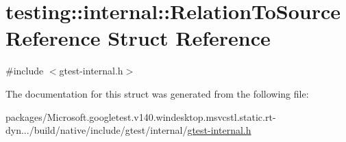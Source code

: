 \hypertarget{structtesting_1_1internal_1_1_relation_to_source_reference}{}\section{testing\+::internal\+::Relation\+To\+Source\+Reference Struct Reference}
\label{structtesting_1_1internal_1_1_relation_to_source_reference}


{\ttfamily \#include $<$gtest-\/internal.\+h$>$}



The documentation for this struct was generated from the following file\+:\begin{DoxyCompactItemize}
\item 
packages/\+Microsoft.\+googletest.\+v140.\+windesktop.\+msvcstl.\+static.\+rt-\/dyn.../build/native/include/gtest/internal/\mbox{\hyperlink{gtest-internal_8h}{gtest-\/internal.\+h}}\end{DoxyCompactItemize}
